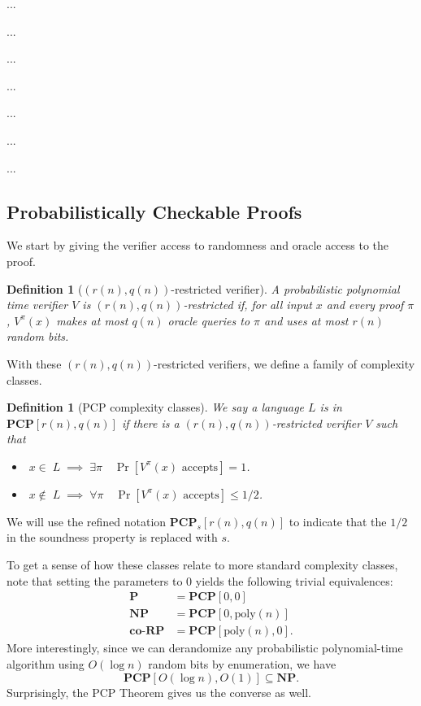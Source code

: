 \documentclass{article}
\newtheorem{definition}[theorem]{Definition}
\newcommand{\poly}{{\mathrm{poly}}}
\newcommand{\class}[1]{\mathbf{#1}}
\newcommand{\coclass}[1]{\mathbf{co\mbox{-}#1}} %
\newcommand{\NP}{\class{NP}}
\newcommand{\PCP}{\class{PCP}}
\newcommand{\coRP}{\coclass{RP}}
\renewcommand{\P}{\class{P}}
\begin{document}
...

...

...

...

...

...

...


\subsection{Probabilistically Checkable Proofs}

We start by giving the verifier access to randomness and oracle access to the
proof.

\begin{definition}[$(r(n), q(n))$-restricted verifier]
A probabilistic polynomial time verifier $V$ is \emph{$(r(n), q(n))$-restricted} if,
for all input $x$ and every proof $\pi$, $V^\pi(x)$ makes at most $q(n)$ oracle queries
to $\pi$ and uses at most $r(n)$ random bits.
\end{definition}

With these $(r(n), q(n))$-restricted verifiers, we define a family of complexity classes.

\begin{definition}[PCP complexity classes]
We say a language $L$ is in $\PCP[r(n), q(n)]$ if there is a
$(r(n), q(n))$-restricted verifier $V$ such that
\begin{itemize}[leftmargin=10em]
\item[\textbf{(Completeness)}] $\;x \in\; L \;\implies\; \exists \pi \quad \Pr[V^\pi(x) \text{ accepts}] = 1$.
\item[\textbf{(Soundness)}] $\;x \notin\; L \;\implies\; \forall \pi \quad \Pr[V^\pi(x) \text{ accepts}] \le 1/2$.
\end{itemize}
\end{definition}
We will use the refined notation $\PCP_s[r(n), q(n)]$ to indicate that
the $1/2$ in the soundness property is replaced with $s$.

To get a sense of how these classes relate to more standard complexity classes,
note that setting the parameters to $0$ yields the following trivial equivalences:
\begin{align*}
\P &= \PCP[0, 0] \\
\NP &= \PCP[0, \poly(n)] \\
\coRP &= \PCP[\poly(n), 0].
\end{align*}
More interestingly, since we can derandomize any probabilistic polynomial-time algorithm
using $O(\log n)$ random bits by enumeration, we have
$$
\PCP[O(\log n), O(1)] \subseteq \NP.
$$
Surprisingly, the PCP Theorem gives us the converse as well.
\end{document}
